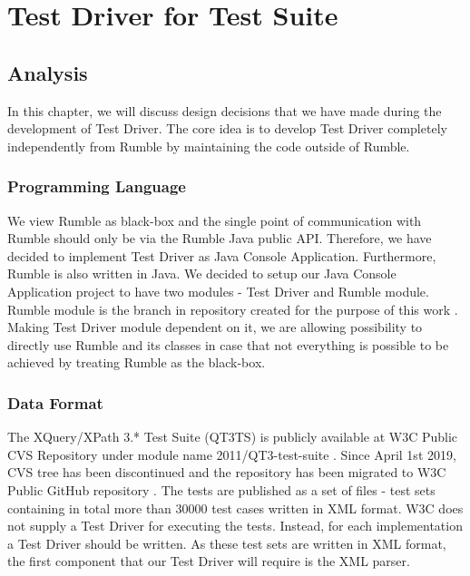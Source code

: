 \chapter{Test Driver for Test Suite}
\section{Analysis}
In this chapter, we will discuss design decisions that we have made during the development of Test Driver. The core idea is to develop Test Driver completely independently from Rumble by maintaining the code outside of Rumble.

\subsection{Programming Language}
 We view Rumble as black-box and the single point of communication with Rumble should only be via the Rumble Java public API. Therefore, we have decided to implement Test Driver as Java Console Application. Furthermore, Rumble is also written in Java. We decided to setup our Java Console Application project to have two modules - Test Driver and Rumble module. Rumble module is the branch in repository created for the purpose of this work \cite{RumbleBranch}. Making Test Driver module dependent on it, we are allowing possibility to directly use Rumble and its classes in case that not everything is possible to be achieved by treating Rumble as the black-box. 

\subsection{Data Format}
The XQuery/XPath 3.* Test Suite (QT3TS) is publicly available at W3C Public CVS Repository under module name 2011/QT3-test-suite \cite{TestSuiteCVSRepository}. Since April 1st 2019, CVS tree has been discontinued and the repository has been migrated to W3C Public GitHub repository \cite{TestSuiteGitHubRepository}. The tests are published as a set of files - test sets containing in total more than 30000 test cases written in XML format. W3C does not supply a Test Driver for executing the tests. Instead, for each implementation a Test Driver should be written. As these test sets are written in XML format, the first component that our Test Driver will require is the XML parser. 

